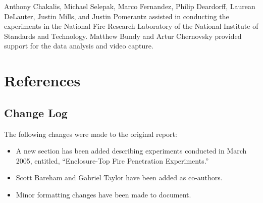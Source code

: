 Anthony Chakalis, Michael Selepak, Marco Fernandez, Philip Deardorff, Laurean DeLauter, Justin Mills, and Justin Pomerantz assisted in conducting the experiments in the National Fire Research Laboratory of the National Institute of Standards and Technology. Matthew Bundy and Artur Chernovsky provided support for the data analysis and video capture.



\clearpage

\section{References}




\clearpage

\begin{appendices}

\section{Change Log}
\label{change_log}

The following changes were made to the original report:
\begin{itemize}
\item A new section has been added describing experiments conducted in March 2005, entitled, ``Enclosure-Top Fire Penetration Experiments.''
\item Scott Bareham and Gabriel Taylor have been added as co-authors.
\item Minor formatting changes have been made to document.
\end{itemize}

\end{appendices}



